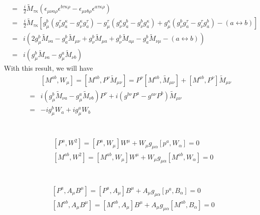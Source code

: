 \documentclass[11pt]{article}
\begin{document}
\begin{itemize}
\begin{eqnarray}
  &=& \frac{i}{2} {\tilde M}_{\tau \kappa}(\epsilon_{\mu\nu a \rho}\epsilon^{b \tau \kappa \rho }-\epsilon_{\mu\nu b \rho}\epsilon^{a \tau \kappa \rho }) \\
  &=&\frac{i}{2} {\tilde M}_{\tau \kappa}[g_\mu^b(g_\nu^\tau g_a^\kappa-g_\nu^\kappa g_a^\tau )-g_\mu^\tau(g_\nu^\kappa g_a^b-g_\nu^b g_a^\kappa )+g_\mu^\kappa(g_\nu^b g_a^\tau-g_\nu^\tau g_a^b)-(a \leftrightarrow b)] \\
  &=&i(2 g_\mu^b {\tilde M}_{\nu a}-g_a^b {\tilde M}_{\mu \nu}+g_\nu^b{\tilde M}_{\mu a}+g_\nu^b{\tilde M}_{ a\mu }-g_a^b{\tilde M}_{ \nu\mu}-(a \leftrightarrow b) )\\
  &=&i(g_\mu^b {\tilde M}_{\nu a}-g_\mu^a {\tilde M}_{\nu b})
\end{eqnarray}
With this result, we will have
\begin{eqnarray}
&&[M^{ab},W_\mu]=[M^{ab},P^\nu {\tilde M}_{\mu \nu}]=P^\nu [M^{ab}, {\tilde M}_{\mu \nu}]+[M^{ab},P^\nu ]{\tilde M}_{\mu \nu} \\
&=&i(g_\mu^b {\tilde M}_{\nu a}-g_\mu^a {\tilde M}_{\nu b}) P^\nu+i( g^{b\nu} P^a - g^{a\nu} P^b  ){\tilde M}_{\mu \nu}\\
&=& -ig_\mu^b W_a+ig_\mu^aW_b
\end{eqnarray}
\end{itemize}

\section{ }
\begin{eqnarray}
  &&[P^a,W^2]=[P^a,W_\mu]W^\mu+ W_\mu g_{\mu\alpha}[p^a, W_\alpha] =0 \\
  &&[M^{ab},W^2]=[M^{ab},W_\mu]W^\mu+ W_\mu g_{\mu\alpha}[M^{ab}, W_\alpha] =0
\end{eqnarray}

\section{ }
\begin{eqnarray}
  &&[P^a,A_\mu B^\mu]=[P^a,A_\mu]B^\mu+ A_\mu g_{\mu\alpha}[p^a, B_\alpha] =0 \\
  &&[M^{ab},A_\mu B^\mu]=[M^{ab},A_\mu]B^\mu+ A_\mu g_{\mu\alpha}[M^{ab}, B_\alpha] =0
\end{eqnarray}
\end{document}
